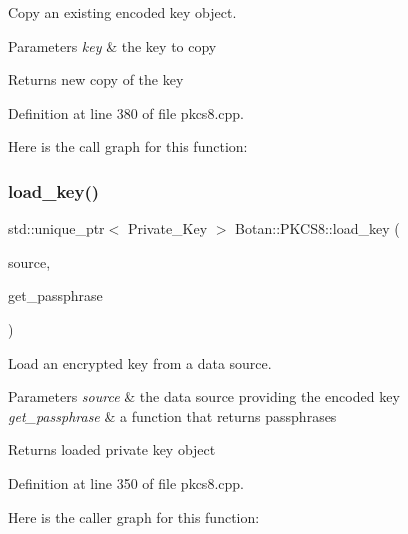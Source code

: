 Copy an existing encoded key object. 
\begin{DoxyParams}{Parameters}
{\em key} & the key to copy \\
\hline
\end{DoxyParams}
\begin{DoxyReturn}{Returns}
new copy of the key 
\end{DoxyReturn}


Definition at line 380 of file pkcs8.\+cpp.

Here is the call graph for this function\+:
\mbox{\label{namespace_botan_1_1_p_k_c_s8_a4f6f93f2069527bb1be1ba1dea671102}} 
\subsubsection{\texorpdfstring{load\+\_\+key()}{load\_key()}\hspace{0.1cm}{\footnotesize\ttfamily [1/3]}}
{\footnotesize\ttfamily std\+::unique\+\_\+ptr$<$ Private\+\_\+\+Key $>$ Botan\+::\+P\+K\+C\+S8\+::load\+\_\+key (\begin{DoxyParamCaption}\item[{Data\+Source \&}]{source,  }\item[{std\+::function$<$ std\+::string()$>$}]{get\+\_\+passphrase }\end{DoxyParamCaption})}

Load an encrypted key from a data source. 
\begin{DoxyParams}{Parameters}
{\em source} & the data source providing the encoded key \\
\hline
{\em get\+\_\+passphrase} & a function that returns passphrases \\
\hline
\end{DoxyParams}
\begin{DoxyReturn}{Returns}
loaded private key object 
\end{DoxyReturn}


Definition at line 350 of file pkcs8.\+cpp.

Here is the caller graph for this function\+:
\mbox{\label{namespace_botan_1_1_p_k_c_s8_a3d0c7493d43c45f3f6c1f03410132c46}} 
